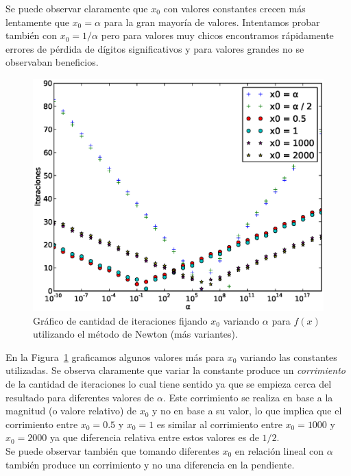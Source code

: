 Se puede observar claramente que $x_0$ con valores constantes crecen más
lentamente que $x_0 = \alpha$ para la gran mayoría de valores. Intentamos
probar también con $x_0 = 1 / \alpha$ pero para valores muy chicos encontramos
rápidamente errores de pérdida de dígitos significativos y para valores grandes
no se observaban beneficios.

\begin{figure}[!htbp]
  \begin{center}
    \includegraphics[scale=0.5]{graficos/new/f_newton_x0_fijo_2.eps}
    \caption{\label{fig:f_newton_x0_fijo_2} Gráfico de cantidad de iteraciones fijando $x_0$ variando $\alpha$ para $f(x)$ utilizando el método de Newton (más variantes).}
  \end{center}
\end{figure}

En la Figura~\ref{fig:f_newton_x0_fijo_2} graficamos algunos valores más para
$x_0$ variando las constantes utilizadas. Se observa claramente que variar la
constante produce un \emph{corrimiento} de la cantidad de iteraciones lo cual
tiene sentido ya que se empieza cerca del resultado para diferentes valores de
$\alpha$. Este corrimiento se realiza en base a la magnitud (o valore relativo)
de $x_0$ y no en base a su valor, lo que implica que el corrimiento entre $x_0
= 0.5$ y $x_0 = 1$ es similar al corrimiento entre $x_0 = 1000$ y $x_0 = 2000$
ya que diferencia relativa entre estos valores es de $1/2$.\\

Se puede observar también que tomando diferentes $x_0$ en relación lineal con
$\alpha$ también produce un corrimiento y no una diferencia en la pendiente.\\

